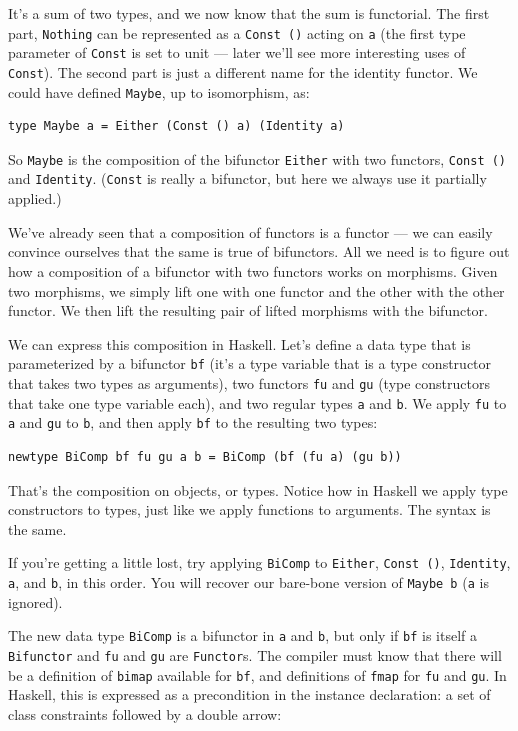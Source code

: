 It's a sum of two types, and we now know that the sum is functorial. The
first part, \texttt{Nothing} can be represented as a \texttt{Const\ ()}
acting on \texttt{a} (the first type parameter of \texttt{Const} is set
to unit --- later we'll see more interesting uses of \texttt{Const}).
The second part is just a different name for the identity functor. We
could have defined \texttt{Maybe}, up to isomorphism, as:

\begin{verbatim}
type Maybe a = Either (Const () a) (Identity a)
\end{verbatim}

So \texttt{Maybe} is the composition of the bifunctor \texttt{Either}
with two functors, \texttt{Const\ ()} and \texttt{Identity}.
(\texttt{Const} is really a bifunctor, but here we always use it
partially applied.)

We've already seen that a composition of functors is a functor --- we
can easily convince ourselves that the same is true of bifunctors. All
we need is to figure out how a composition of a bifunctor with two
functors works on morphisms. Given two morphisms, we simply lift one
with one functor and the other with the other functor. We then lift the
resulting pair of lifted morphisms with the bifunctor.

We can express this composition in Haskell. Let's define a data type
that is parameterized by a bifunctor \texttt{bf} (it's a type variable
that is a type constructor that takes two types as arguments), two
functors \texttt{fu} and \texttt{gu} (type constructors that take one
type variable each), and two regular types \texttt{a} and \texttt{b}. We
apply \texttt{fu} to \texttt{a} and \texttt{gu} to \texttt{b}, and then
apply \texttt{bf} to the resulting two types:

\begin{verbatim}
newtype BiComp bf fu gu a b = BiComp (bf (fu a) (gu b))
\end{verbatim}

That's the composition on objects, or types. Notice how in Haskell we
apply type constructors to types, just like we apply functions to
arguments. The syntax is the same.

If you're getting a little lost, try applying \texttt{BiComp} to
\texttt{Either}, \texttt{Const\ ()}, \texttt{Identity}, \texttt{a}, and
\texttt{b}, in this order. You will recover our bare-bone version of
\texttt{Maybe\ b} (\texttt{a} is ignored).

The new data type \texttt{BiComp} is a bifunctor in \texttt{a} and
\texttt{b}, but only if \texttt{bf} is itself a \texttt{Bifunctor} and
\texttt{fu} and \texttt{gu} are \texttt{Functor}s. The compiler must
know that there will be a definition of \texttt{bimap} available for
\texttt{bf}, and definitions of \texttt{fmap} for \texttt{fu} and
\texttt{gu}. In Haskell, this is expressed as a precondition in the
instance declaration: a set of class constraints followed by a double
arrow:

